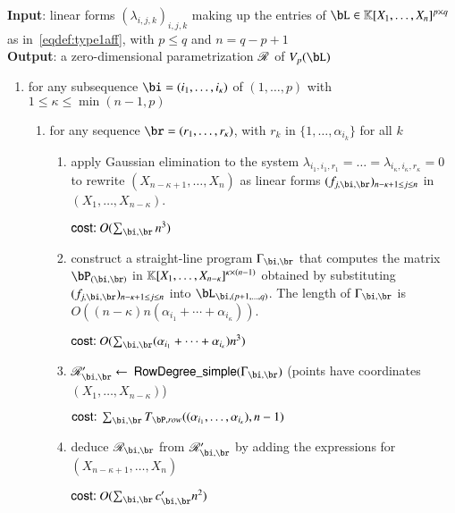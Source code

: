 \documentclass[amsthm]{elsart}
\begin{document}
\begin{algorithm}[!t]
\caption{$\mathsf{RowDegreeDiagonal}((\lambda_{i,j,k})_{i,j,k})$}
{\bf Input}: linear forms $(\lambda_{i,j,k})_{i,j,k}$ making up 
the entries of 
$\bL \in \KK[X_1, \ldots, X_n]^{p \times q}$ as in~\eqref{eqdef:type1aff}, with $p \leq q$ and $n = q-p+1$\\
{\bf Output}: a zero-dimensional parametrization $\mathscr{R}$ of $V_p(\bL)$
\begin{enumerate}
\item for any subsequence $\bi = (i_1, \ldots, i_\kappa)$ of $(1, \ldots, p)$ with $1 \leq \kappa \leq\min(n-1,p)$
  \begin{enumerate}
  \item for any sequence $\br = (r_1, \ldots, r_\kappa)$, with $r_k$ in 
    $\{1,\dots,\alpha_{i_k}\}$ for all $k$
    \begin{enumerate}
    \item apply Gaussian elimination to the system 
      $\lambda_{i_1,i_1,r_1}=\dots=\lambda_{i_\kappa,i_\kappa,r_\kappa}=0$
      to rewrite $(X_{n-\kappa+1}, \ldots, X_n)$ as linear forms $(f_{j,\bi,\br})_{n-\kappa+1 \le j \le n}$ in $(X_1, \ldots, X_{n-\kappa})$. 

\hfill $\text{\sf{cost:~}} O(\sum_{\bi,\br} n^3)$
    \item\label{step:constSLP} construct a straight-line program $\Gamma_{\bi,\br}$ that computes the matrix $\bP_{(\bi,\br)}$ in $\mathbb{K}[X_1, \dots, X_{n-\kappa}]^{\kappa \times (n-1)}$ obtained
      by substituting $(f_{j,\bi,\br})_{n-\kappa+1 \le j \le n}$ into $\bL_{\bi,(p+1, \ldots, q)}$. The length of $\Gamma_{\bi,\br}$ is $O((n-\kappa) n(\alpha_{i_1}+\cdots+\alpha_{i_\kappa}))$.

\hfill $\text{\sf{cost:~}} O(\sum_{\bi,\br} (\alpha_{i_1} + \cdots + \alpha_{i_\kappa}) n^3)$
    \item $\scrR_{\bi,\br}' \gets$ $\mathsf{RowDegree\_simple}(\Gamma_{\bi,\br})$  (points have coordinates $(X_1, \ldots, X_{n-\kappa})$)

\hfill $\text{\sf{cost:~}} \sum_{\bi,\br} T_{\bP,{\rm row}}((\alpha_{i_1},\dots,\alpha_{i_\kappa}), n-1)$
    \item\label{step:substdiag} deduce $\scrR_{\bi,\br}$ from $\scrR_{\bi,\br}'$ by adding the expressions for $(X_{n-\kappa+1}, \ldots, X_n)$

\hfill      $\text{\sf{cost:~}} O(\sum_{\bi,\br}  c'_{\bi,\br} n^2)$
  \end{enumerate}
  \end{enumerate}


\end{enumerate}
\end{algorithm}
\end{document}
